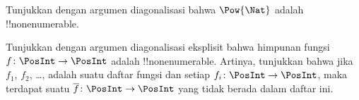 \documentclass[../../../include/open-logic-section]{subfiles}
\begin{document}
\begin{prob}
Tunjukkan dengan argumen diagonalisasi bahwa $\Pow{\Nat}$ adalah
!!{nonenumerable}.
\end{prob}

\begin{prob}\label{sfr:siz:nen:prob:f-posint}
Tunjukkan dengan argumen diagonalisasi eksplisit bahwa himpunan fungsi $f \colon
\PosInt \to \PosInt$ adalah !!{nonenumerable}. Artinya, tunjukkan bahwa jika
$f_1$, $f_2$, \dots, adalah suatu daftar fungsi dan setiap $f_i\colon \PosInt
\to \PosInt$, maka terdapat suatu $\overline{f}\colon \PosInt \to \PosInt$
yang tidak berada dalam daftar ini.
\end{prob}
\end{document}
